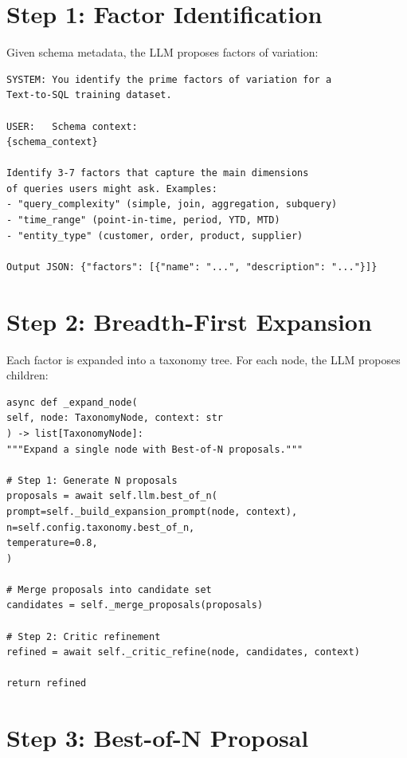 \documentclass[12pt,a4paper,twoside]{report}
\begin{document}
\section{Step 1: Factor Identification}

Given schema metadata, the LLM proposes factors of variation:

\begin{lstlisting}[language=jsonx,caption={Factor identification prompt}]
SYSTEM: You identify the prime factors of variation for a
Text-to-SQL training dataset.

USER:   Schema context:
{schema_context}

Identify 3-7 factors that capture the main dimensions
of queries users might ask. Examples:
- "query_complexity" (simple, join, aggregation, subquery)
- "time_range" (point-in-time, period, YTD, MTD)
- "entity_type" (customer, order, product, supplier)

Output JSON: {"factors": [{"name": "...", "description": "..."}]}
\end{lstlisting}

\section{Step 2: Breadth-First Expansion}

Each factor is expanded into a taxonomy tree. For each node, the LLM proposes children:

\begin{lstlisting}[language=jsonx,caption={Node expansion (simula\_taxonomy\_builder.py, lines 180--220)}]
async def _expand_node(
self, node: TaxonomyNode, context: str
) -> list[TaxonomyNode]:
"""Expand a single node with Best-of-N proposals."""

# Step 1: Generate N proposals
proposals = await self.llm.best_of_n(
prompt=self._build_expansion_prompt(node, context),
n=self.config.taxonomy.best_of_n,
temperature=0.8,
)

# Merge proposals into candidate set
candidates = self._merge_proposals(proposals)

# Step 2: Critic refinement
refined = await self._critic_refine(node, candidates, context)

return refined
\end{lstlisting}

\section{Step 3: Best-of-N Proposal}
\end{document}
